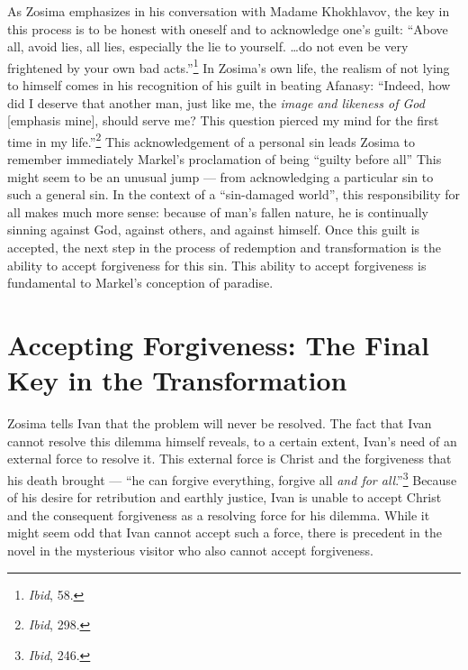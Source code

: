 As Zosima emphasizes in his conversation with Madame Khokhlavov, the key in this process is to be honest with oneself and to acknowledge one's guilt: ``Above all, avoid lies, all lies, especially the lie to yourself. \ldots do not even be very frightened by your own bad acts.''\footnote{\emph{Ibid}, 58.} In Zosima's own life, the realism of not lying to himself comes in his recognition of his guilt in beating Afanasy: ``Indeed, how did I deserve that another man, just like me, the \emph{image and likeness of God} [emphasis mine], should serve me? This question pierced my mind for the first time in my life.''\footnote{\emph{Ibid}, 298.} This acknowledgement of a personal sin leads Zosima to remember immediately Markel's proclamation of being ``guilty before all'' This might seem to be an unusual jump --- from acknowledging a particular sin to such a general sin. In the context of a ``sin-damaged world'', this responsibility for all makes much more sense: because of man's fallen nature, he is continually sinning against God, against others, and against himself. Once this guilt is accepted, the next step in the process of redemption and transformation is the ability to accept forgiveness for this sin. This ability to accept forgiveness is fundamental to Markel's conception of paradise.

\section{Accepting Forgiveness: The Final Key in the Transformation}
Zosima tells Ivan that the problem will never be resolved. The fact that Ivan cannot resolve this dilemma himself reveals, to a certain extent, Ivan's need of an external force to resolve it. This external force is Christ and the forgiveness that his death brought --- ``he can forgive everything, forgive all \emph{and for all}.''\footnote{\emph{Ibid}, 246.} Because of his desire for retribution and earthly justice, Ivan is unable to accept Christ and the consequent forgiveness as a resolving force for his dilemma. While it might seem odd that Ivan cannot accept such a force, there is precedent in the novel in the mysterious visitor who also cannot accept forgiveness.

